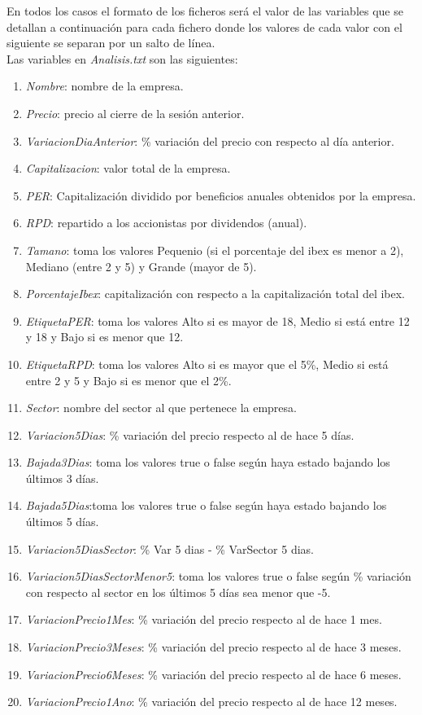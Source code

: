 \documentclass[12pt]{article}
\begin{document}
En todos los casos el formato de los ficheros será el valor de las variables que se detallan a continuación para cada fichero donde los valores de cada valor con el siguiente se separan por un salto de línea.\\

Las variables en \textit{Analisis.txt} son las siguientes:
\begin{enumerate}
\item \textit{Nombre}: nombre de la empresa.
\item \textit{Precio}: precio al cierre de la sesión anterior.
\item \textit{VariacionDiaAnterior}: \% variación del precio con respecto al día anterior.
\item \textit{Capitalizacion}: valor total de la empresa.
\item \textit{PER}: Capitalización dividido por beneficios anuales obtenidos por la empresa.
\item \textit{RPD}: repartido a los accionistas por dividendos (anual).
\item \textit{Tamano}: toma los valores Pequenio (si el porcentaje del ibex es menor a 2), Mediano (entre 2 y 5) y Grande (mayor de 5).
\item \textit{PorcentajeIbex}: capitalización con respecto a la capitalización total del ibex.
\item \textit{EtiquetaPER}: toma los valores Alto si es mayor de 18, Medio si está entre 12 y 18 y Bajo si es menor que 12.
\item \textit{EtiquetaRPD}: toma los valores Alto si es mayor que el 5\%, Medio si está entre 2 y 5 y Bajo si es menor que el 2\%.
\item \textit{Sector}: nombre del sector al que pertenece la empresa.
\item \textit{Variacion5Dias}: \% variación del precio respecto al de hace 5 días.
\item \textit{Bajada3Dias}: toma los valores true o false según haya estado bajando los últimos 3 días.
\item \textit{Bajada5Dias}:toma los valores true o false según haya estado bajando los últimos 5 días.
\item \textit{Variacion5DiasSector}: \% Var 5 dias - \% VarSector 5 dias.
\item \textit{Variacion5DiasSectorMenor5}: toma los valores true o false según \% variación con respecto al sector en los últimos 5 días sea menor que -5.
\item \textit{VariacionPrecio1Mes}: \% variación del precio respecto al de hace 1 mes.
\item \textit{VariacionPrecio3Meses}: \% variación del precio respecto al de hace 3 meses. 
\item \textit{VariacionPrecio6Meses}: \% variación del precio respecto al de hace 6 meses. 
\item \textit{VariacionPrecio1Ano}: \% variación del precio respecto al de hace 12 meses. 
\end{enumerate}
\textit{ }\\
\end{document}
